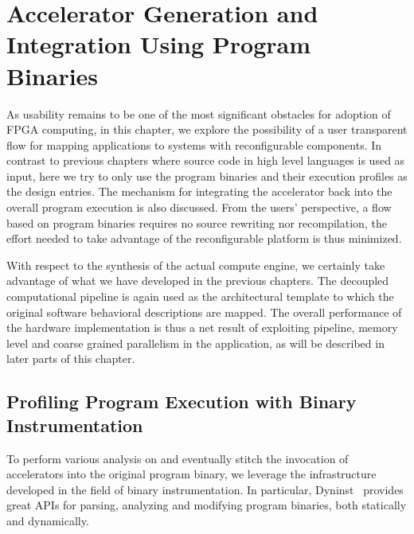 \chapter{Accelerator Generation and Integration Using Program Binaries}
\label{instrumentChap}
As usability remains to be one of the most significant obstacles for adoption of FPGA computing, in this chapter, we explore the possibility of a user
transparent flow for mapping applications to systems with reconfigurable components.
In contrast to previous chapters where source code in high level
languages is used as input, here we try to only use the program binaries and their execution profiles as the design entries. 
The mechanism for integrating the accelerator back into the overall program execution is also discussed. 
From the users' perspective, a flow based on
program binaries requires no source rewriting
nor recompilation, the effort needed to take advantage
of the reconfigurable platform is thus minimized. 

With respect to the synthesis of the actual compute engine, we certainly take advantage of what we have developed in the previous chapters. 
The decoupled computational pipeline is again used as the architectural
template to which the original software behavioral descriptions are mapped. The overall performance of the hardware implementation is thus a net result of exploiting pipeline, memory level and coarse grained parallelism in the application, as will be described in later parts of this chapter.

\section{Profiling Program Execution with Binary Instrumentation}
To perform various analysis on and eventually stitch the invocation of accelerators into the original program binary, we leverage the infrastructure developed in the field
of binary instrumentation. In particular, Dyninst~\cite{dyninst}  provides
great APIs for parsing, analyzing and modifying  program binaries, both statically and dynamically. 



